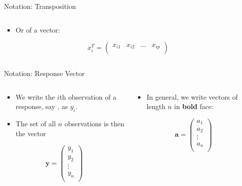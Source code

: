 \documentclass[mathserif, aspectratio=169]{beamer}
\begin{document}
\begin{frame}{Notation: Transposition}
\begin{columns}[t]
\begin{column}{0.5\textwidth}
\begin{itemize}
				\item Or of a vector:
			\end{itemize}
			\vspace{-9mm}
			\begin{center}
				\[
					x_i^T =
					\begin{pmatrix}
						x_{i1} & x_{i2} & \dots & x_{ip} \\
					\end{pmatrix}
				\]
			\end{center}
		\end{column}
	\end{columns}
\end{frame}

\begin{frame}{Notation: Response Vector}
	\vspace{-3mm}
	\begin{columns}[t]
		\begin{column}{0.5\textwidth}
			\begin{itemize}
				\item We write the $i$th observation of a response, say , as $y_i$.
				\item The set of all $n$ observations is then the vector 
			\end{itemize}
			\vspace{-8mm}
			\begin{center}
				\[
					\bm{y} =
					\begin{pmatrix}
						y_1 \\ y_2 \\ \vdots \\ y_n \\
					\end{pmatrix}
				\]
			\end{center}
		\end{column}
		\begin{column}{0.5\textwidth}
			\begin{itemize}
				\item In general, we write vectors of length $n$ in {\bfseries bold} face:
			\end{itemize}
			\vspace{-9mm}
			\begin{center}
				\[
					\bm{a} =
					\begin{pmatrix}
						a_1 \\ a_2 \\ \vdots \\ a_n \\

\end{pmatrix}\]
\end{center}
\end{column}
\end{columns}
\end{frame}
\end{document}
